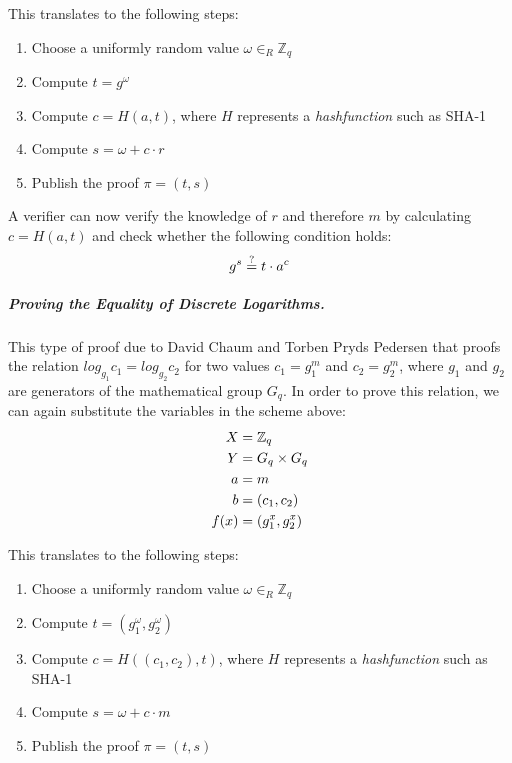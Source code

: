 \documentclass[numbers=noenddot, abstract=on]{scrreprt}
\begin{document}
This translates to the following steps:

\begin{enumerate}
  \item Choose a uniformly random value $\omega \in_R \mathbb{Z}_q$
  \item Compute $t=g^\omega$
  \item Compute $c=H(a,t)$, where $H$ represents a \textit{hashfunction} such as
  SHA-1
  \item Compute $s=\omega + c \cdot r$
  \item Publish the proof $\pi = (t,s)$
\end{enumerate}

A verifier can now verify the knowledge of $r$ and therefore $m$ by calculating
$c=H(a,t)$ and check whether the following condition holds:
\begin{equation}
	g^s \stackrel{?}{=} t \cdot a^c \notag
\end{equation}

\subparagraph{Proving the Equality of Discrete Logarithms.}
This type of proof due to David Chaum and Torben Pryds Pedersen \cite{CP93}
that proofs the relation $log_{g_1} c_1 = log_{g_2} c_2 $ for two values $c_1 =
g_1^m$ and $c_2 = g_2^m$, where $g_1$ and $g_2$ are generators of the
mathematical group $G_q$. In order to prove this relation, we can again
substitute the variables in the scheme above:
\begin{align}
  X &= \mathbb{Z}_q \notag \\
  Y &= G_q \times G_q \notag \\
  a &=m \notag \\
  b &=(c_1, c_2) \notag \\
  f(x) &= (g_1^x, g_2^x) \notag
\end{align} 

This translates to the following steps:

\begin{enumerate}
  \item Choose a uniformly random value $\omega \in_R \mathbb{Z}_q$
  \item Compute $t=(g_1^\omega, g_2^\omega)$
  \item Compute $c=H((c_1,c_2),t)$, where $H$ represents a \textit{hashfunction}
  such as SHA-1
  \item Compute $s=\omega + c \cdot m$
  \item Publish the proof $\pi = (t,s)$
\end{enumerate}
\end{document}
